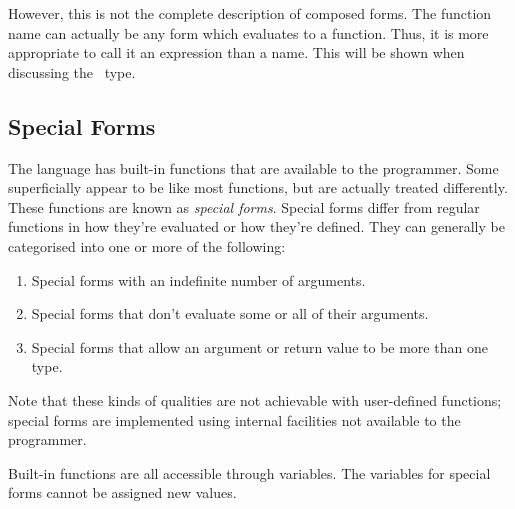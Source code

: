 However, this is not the complete description of composed forms. The function name can actually be any form which evaluates to a function. Thus, it is more appropriate to call it an expression than a name. This will be shown when discussing the~ type.

\subsection{Special Forms}
The language has built-in functions that are available to the programmer. Some superficially appear to be like most functions, but are actually treated differently. These functions are known as \textit{special forms}. Special forms differ from regular functions in how they're evaluated or how they're defined. They can generally be categorised into one or more of the following:

\begin{enumerate}
    \item Special forms with an indefinite number of arguments.
    \item Special forms that don't evaluate some or all of their arguments.
    \item Special forms that allow an argument or return value to be more than one type.
\end{enumerate}

Note that these kinds of qualities are not achievable with user-defined functions; special forms are implemented using internal facilities not available to the programmer.

Built-in functions are all accessible through variables. The variables for special forms cannot be assigned new values.
